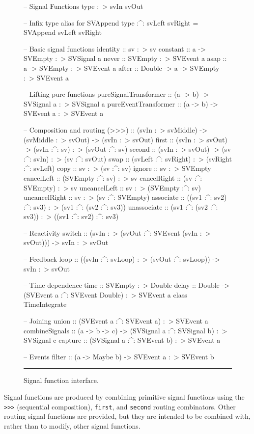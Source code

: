 \documentclass[draft]{llncs}
\begin{document}
\begin{figure}
\begin{code}

-- Signal Functions
type :~> svIn svOut

-- Infix type alias for SVAppend
type :^: svLeft svRight = SVAppend svLeft svRight

-- Basic signal functions
identity :: sv :~> sv
constant :: a -> SVEmpty :~> SVSignal a
never    :: SVEmpty :~> SVEvent a
asap     :: a -> SVEmpty :~> SVEvent a
after    :: Double -> a -> SVEmpty :~> SVEvent a

-- Lifting pure functions
pureSignalTransformer :: (a -> b) -> SVSignal a :~> SVSignal a
pureEventTransformer  :: (a -> b) -> SVEvent a :~> SVEvent a

-- Composition and routing
(>>>)           :: (svIn :~> svMiddle) -> (svMiddle :~> svOut) 
                   -> (svIn :~> svOut)
first           :: (svIn :~> svOut) -> (svIn :^: sv) :~> (svOut :^: sv)
second          :: (svIn :~> svOut) -> (sv :^: svIn) :~> (sv :^: svOut) 
swap            :: (svLeft :^: svRight) :~> (svRight :^: svLeft)
copy            :: sv :~> (sv :^: sv)
ignore          :: sv :~> SVEmpty
cancelLeft      :: (SVEmpty :^: sv) :~> sv
cancelRight     :: (sv :^: SVEmpty) :~> sv
uncancelLeft    :: sv :~> (SVEmpty :^: sv)
uncancelRight   :: sv :~> (sv :^: SVEmpty)
associate       :: ((sv1 :^: sv2) :^: sv3) :~> (sv1 :^: (sv2 :^: sv3)) 
unassociate     :: (sv1 :^: (sv2 :^: sv3)) :~> ((sv1 :^: sv2) :^: sv3)

-- Reactivity
switch :: (svIn :~> (svOut :^: SVEvent (svIn :~> svOut))) 
          -> svIn :~> svOut

-- Feedback
loop :: ((svIn :^: svLoop) :~> (svOut :^: svLoop)) -> svIn :~> svOut

-- Time dependence
time  :: SVEmpty :~> Double
delay :: Double -> (SVEvent a :^: SVEvent Double) :~> SVEvent a
class TimeIntegrate

-- Joining
union          :: (SVEvent a :^: SVEvent a) :~> SVEvent a
combineSignals :: (a -> b -> c) 
                  -> (SVSignal a :^: SVSignal b) :~> SVSignal c
capture        :: (SVSignal a :^: SVEvent b) :~> SVEvent a

-- Events
filter         :: (a -> Maybe b) -> SVEvent a :~> SVEvent b
\end{code}
\hrule
\caption{Signal function interface.}
\label{figure:signal_function_interface}
\end{figure}

Signal functions are produced by combining primitive signal functions using
the {\tt >>>} (sequential composition), {\tt first}, and {\tt second} routing
combinators. Other routing signal functions are provided, but they are intended
to be combined with, rather than to modify, other signal functions.
\end{document}
